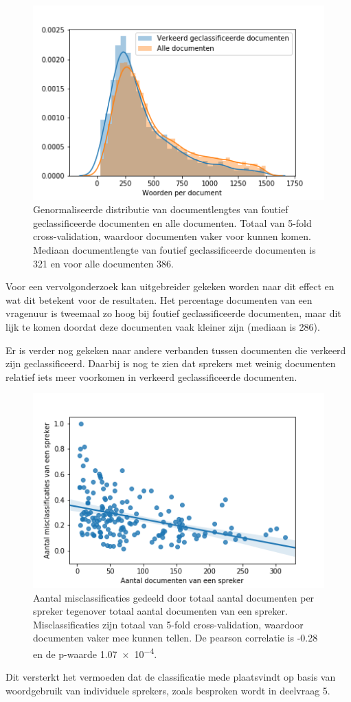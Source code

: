 \begin{figure}[H]
  \centering
    \includegraphics[width=0.40\paperwidth]{Verslag/Tables/misclassifiedlengths.png}
\caption{Genormaliseerde distributie van documentlengtes van foutief geclassificeerde documenten en alle documenten. Totaal van 5-fold cross-validation, waardoor documenten vaker voor kunnen komen. Mediaan documentlengte van foutief geclassificeerde documenten is 321 en voor alle documenten 386.}
\label{fig:misclassified}
\end{figure}
Voor een vervolgonderzoek kan uitgebreider gekeken worden naar dit effect en wat dit betekent voor de resultaten. Het percentage documenten van een vragenuur is tweemaal zo hoog bij foutief geclassificeerde documenten, maar dit lijk te komen doordat deze documenten vaak kleiner zijn (mediaan is 286).\par
Er is verder nog gekeken naar andere verbanden tussen documenten die verkeerd zijn geclassificeerd. Daarbij is nog te zien dat sprekers met weinig documenten relatief iets meer voorkomen in verkeerd geclassificeerde documenten.
\begin{figure}[H]
  \centering
    \includegraphics[width=0.40\paperwidth]{Verslag/Tables/misclassifiedsprekers.png}
\caption{Aantal misclassificaties gedeeld door totaal aantal documenten per spreker tegenover totaal aantal documenten van een spreker. Misclassificaties zijn totaal van 5-fold cross-validation, waardoor documenten vaker mee kunnen tellen. De pearson correlatie is -0.28 en de p-waarde \num{1.07e-4}.}
\label{fig:misclassified}
\end{figure}
Dit versterkt het vermoeden dat de classificatie mede plaatsvindt op basis van woordgebruik van individuele sprekers, zoals besproken wordt in deelvraag 5.\par


